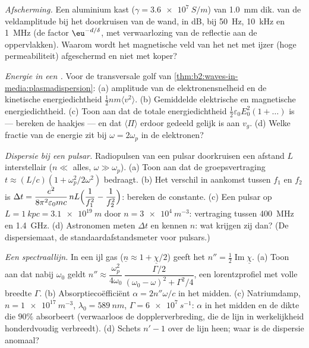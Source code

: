 \begin{exercise}[$\star\star$]\label{exo:b2:waves-in-media:6}
\emph{Afscherming.} Een aluminium kast ($\gamma = \qty{3.6e7}{S/m}$) van
\qty{1.0}{mm} dik.  van de veldamplitude bij het doorkruisen van
de wand, in dB, bij \qty{50}{Hz}, \qty{10}{kHz} en \qty{1}{MHz} (de factor
$\eu^{-d/\delta}$, met verwaarlozing van de reflectie aan de oppervlakken).
Waarom wordt het magnetische veld van het net met ijzer (hoge
permeabiliteit) afgeschermd en niet met koper?
\end{exercise}

\begin{exercise}[$\star\star$]\label{exo:b2:waves-in-media:7}
\emph{Energie in een .} Voor de transversale golf van
\cref{thm:b2:waves-in-media:plasmadispersion}: (a) amplitude van de
elektronensnelheid en de kinetische energiedichtheid
$\tfrac12nm\langle v^2\rangle$. (b) Gemiddelde elektrische en magnetische
energiedichtheid. (c) Toon aan dat de totale energiedichtheid
$\tfrac12\varepsilon_0E_0^2(1 + \dots)$ is --- bereken de haakjes --- en dat
$\langle\Pi\rangle$ erdoor gedeeld gelijk is aan $v_g$. (d) Welke fractie
van de energie zit bij $\omega = 2\omega_p$ in de elektronen?
\end{exercise}

\begin{exercise}[$\star\star$]\label{exo:b2:waves-in-media:8}
\emph{Dispersie bij een pulsar.} Radiopulsen van een pulsar doorkruisen een
afstand $L$ interstellair  ($n \ll$ alles, $\omega \gg \omega_p$). (a)
Toon aan dat de groepsvertraging $t \approx (L/c)(1 + \omega_p^2/2\omega^2)$
bedraagt. (b) Het verschil in aankomst tussen $f_1$ en $f_2$ is
$\Delta t = \dfrac{e^2}{8\pi^2
\varepsilon_0mc}\,nL\Bigl(\dfrac1{f_1^2} - \dfrac1{f_2^2}\Bigr)$:
bereken de constante. (c) Een pulsar op $L = \qty{1}{kpc} = \qty{3.1e19}{m}$
door $n = \qty{3e4}{m^{-3}}$: vertraging tussen \qty{400}{MHz} en
\qty{1.4}{GHz}. (d) Astronomen meten $\Delta t$ en kennen $n$: wat krijgen
zij dan? (De dispersiemaat, de standaardafstandsmeter voor pulsars.)
\end{exercise}

\begin{exercise}[$\star\star$]\label{exo:b2:waves-in-media:9}
\emph{Een spectraallijn.} In een ijl gas
($\underline n \approx 1 + \underline\chi/2$) geeft het 
$n'' = \tfrac12\operatorname{Im}\underline\chi$. (a) Toon aan dat nabij
$\omega_0$ geldt
$n'' \approx \dfrac{\omega_p^2}{4\omega_0}\,\dfrac{\Gamma/2}{(\omega_0 - \omega)^2 + \Gamma^2/4}$,
een lorentzprofiel met volle breedte $\Gamma$. (b) Absorptiecoëfficiënt
$\alpha = 2n''\omega/c$ in het midden. (c) Natriumdamp,
$n = \qty{1e17}{m^{-3}}$, $\lambda_0 = \qty{589}{nm}$,
$\Gamma = \qty{6e7}{s^{-1}}$: $\alpha$ in het midden en de dikte die $90\%$
absorbeert (verwaarloos de dopplerverbreding, die de lijn in werkelijkheid
honderdvoudig verbreedt). (d) Schets $n' - 1$ over de lijn heen; waar is de
dispersie anomaal?
\end{exercise}

